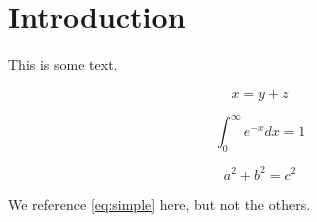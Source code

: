 \documentclass{article}
\begin{document}
\section{Introduction}
\label{sec:intro}

This is some text.

\begin{equation}
  \label{eq:simple}
  x = y + z
\end{equation}

\begin{equation}
  \label{eq:complex}
  \int_0^\infty e^{-x} dx = 1
\end{equation}

\begin{equation}
  \label{eq:orphan}
  a^2 + b^2 = c^2
\end{equation}

We reference \eqref{eq:simple} here, but not the others.
\end{document}
